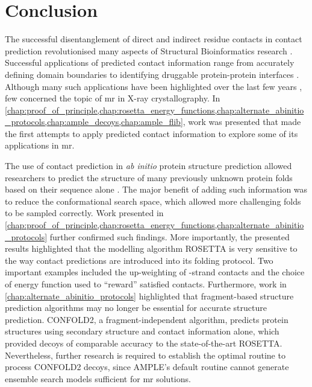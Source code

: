 \section{Conclusion}
The successful disentanglement of direct and indirect residue contacts in contact prediction revolutionised many aspects of Structural Bioinformatics research \cite{Simkovic2017-xs}. Successful applications of predicted contact information range from accurately defining domain boundaries \cite{Sadowski2013-zu} to identifying druggable protein-protein interfaces \cite{Bai2016-sw}. Although many such applications have been highlighted over the last few years \cite{Simkovic2017-xs}, few concerned the topic of \gls{mr} in X-ray crystallography. In \cref{chap:proof_of_principle,chap:rosetta_energy_functions,chap:alternate_abinitio_protocols,chap:ample_decoys,chap:ample_flib}, work was presented that made the first attempts to apply predicted contact information to explore some of its applications in \gls{mr}.

The use of contact prediction in \textit{ab initio} protein structure prediction allowed researchers to predict the structure of many previously unknown protein folds based on their sequence alone \cite[e.g.,][]{Marks2011-os,Michel2014-eg,Kosciolek2014-bt,Ovchinnikov2015-tn,Ovchinnikov2016-jj,Michel2017-xh,De_Oliveira2018-sg,Ovchinnikov2017-nd,Wang2017-rx}. The major benefit of adding such information was to reduce the conformational search space, which allowed more challenging folds to be sampled correctly. Work presented in \cref{chap:proof_of_principle,chap:rosetta_energy_functions,chap:alternate_abinitio_protocols} further confirmed such findings. More importantly, the presented results highlighted that the modelling algorithm ROSETTA is very sensitive to the way contact predictions are introduced into its folding protocol. Two important examples included the up-weighting of \textbeta-strand contacts and the choice of energy function used to ``reward'' satisfied contacts. Furthermore, work in \cref{chap:alternate_abinitio_protocols} highlighted that fragment-based structure prediction algorithms may no longer be essential for accurate structure prediction. CONFOLD2, a fragment-independent algorithm, predicts protein structures using secondary structure and contact information alone, which provided decoys of comparable accuracy to the state-of-the-art ROSETTA. Nevertheless, further research is required to establish the optimal routine to process CONFOLD2 decoys, since AMPLE's default routine cannot generate ensemble search models sufficient for \gls{mr} solutions.

